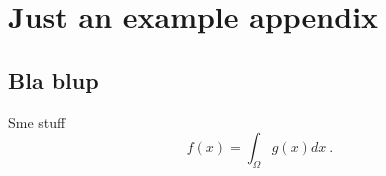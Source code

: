 \chapter{Just an example appendix}
\label{app_ex1}


\section{Bla blup}

Sme stuff
\begin{equation}
	f(x) = \int_{\Omega} g(x) dx \ .
\end{equation}